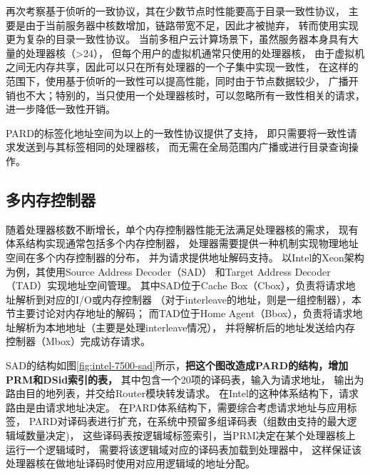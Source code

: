 再次考察基于侦听的一致协议，其在少数节点时性能要高于目录一致性协议，
主要是由于当前服务器中核数增加，链路带宽不足，因此才被抛弃，
转而使用实现更为复杂的目录一致性协议。
当前多租户云计算场景下，虽然服务器本身具有大量的处理器核（>24），
但每个用户的虚拟机通常只使用的处理器核\cite{}，    %
由于虚拟机之间无内存共享，因此可以只在所有处理器的一个子集中实现一致性，
在这样的范围下，使用基于侦听的一致性可以提高性能，同时由于节点数据较少，
广播开销也不大；特别的，当只使用一个处理器核时，可以忽略所有一致性相关的请求，
进一步降低一致性开销。

PARD的标签化地址空间为以上的一致性协议提供了支持，
即只需要将一致性请求发送到与其标签相同的处理器核，
而无需在全局范围内广播或进行目录查询操作。



\subsection{多内存控制器}

随着处理器核数不断增长，单个内存控制器性能无法满足处理器核的需求，
现有体系结构实现通常包括多个内存控制器\cite{}，
处理器需要提供一种机制实现物理地址空间在多个内存控制器的分布，
并为请求提供地址解码支持。
以Intel的Xeon架构为例，其使用Source Address Decoder（SAD）
和Target Address Decoder（TAD）实现地址空间管理\cite{intel-xeon-7500}。
其中SAD位于Cache Box（Cbox），负责将请求地址解析到对应的I/O或内存控制器
（对于interleave的地址，则是一组控制器），本节主要讨论对内存地址的解码；
而TAD位于Home Agent（Bbox），负责将请求地址解析为本地地址（主要是处理interleave情况），
并将解析后的地址发送给内存控制器（Mbox）完成访存请求。

SAD的结构如图\ref{fig:intel-7500-sad}所示，\textbf{把这个图改造成PARD的结构，增加PRM和DSid索引的表，}
其中包含一个20项的译码表，输入为请求地址，
输出为路由目的地列表，并交给Router模块转发请求。
在Intel的这种体系结构下，请求路由是由请求地址决定。
在PARD体系结构下，需要综合考虑请求地址与应用标签，
PARD对译码表进行扩充，在系统中预留多组译码表（组数由支持的最大逻辑域数量决定)，
这些译码表按逻辑域标签索引，当PRM决定在某个处理器核上运行一个逻辑域时，
需要将该逻辑域对应的译码表加载到处理器中，
这样保证该处理器核在做地址译码时使用对应用逻辑域的地址分配。

